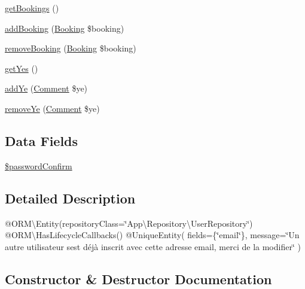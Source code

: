 \begin{DoxyCompactItemize}
\item 
\mbox{\hyperlink{class_app_1_1_entity_1_1_user_a3dba7af3ac89f0c7c191024c2bcbf2e5}{get\+Bookings}} ()
\item 
\mbox{\hyperlink{class_app_1_1_entity_1_1_user_a843c4ecdcf427fcc51745d213a56ee66}{add\+Booking}} (\mbox{\hyperlink{class_app_1_1_entity_1_1_booking}{Booking}} \$booking)
\item 
\mbox{\hyperlink{class_app_1_1_entity_1_1_user_a5b4bef85b0d6ad2c0129284d14b5d2d8}{remove\+Booking}} (\mbox{\hyperlink{class_app_1_1_entity_1_1_booking}{Booking}} \$booking)
\item 
\mbox{\hyperlink{class_app_1_1_entity_1_1_user_a08f19a82bff9dffe7599c79d64ca38b3}{get\+Yes}} ()
\item 
\mbox{\hyperlink{class_app_1_1_entity_1_1_user_a711777ae6a0783700bbe5a8903690551}{add\+Ye}} (\mbox{\hyperlink{class_app_1_1_entity_1_1_comment}{Comment}} \$ye)
\item 
\mbox{\hyperlink{class_app_1_1_entity_1_1_user_a3fa5f138ac8e5bd6ba42a25f0ceaa696}{remove\+Ye}} (\mbox{\hyperlink{class_app_1_1_entity_1_1_comment}{Comment}} \$ye)
\end{DoxyCompactItemize}
\subsection*{Data Fields}
\begin{DoxyCompactItemize}
\item 
\mbox{\hyperlink{class_app_1_1_entity_1_1_user_a3feb982090765e64bee6301431331696}{\$password\+Confirm}}
\end{DoxyCompactItemize}


\subsection{Detailed Description}
@\+O\+RM\textbackslash{}\+Entity(repository\+Class=\char`\"{}\+App\textbackslash{}\+Repository\textbackslash{}\+User\+Repository\char`\"{}) @\+O\+RM\textbackslash{}\+Has\+Lifecycle\+Callbacks() @\+Unique\+Entity( fields=\{\char`\"{}email\char`\"{}\}, message=\char`\"{}\+Un autre utilisateur s\textquotesingle{}est déjà inscrit avec cette adresse email, merci de la modifier\char`\"{} ) 

\subsection{Constructor \& Destructor Documentation}
\mbox{\label{class_app_1_1_entity_1_1_user_a095c5d389db211932136b53f25f39685}} 
